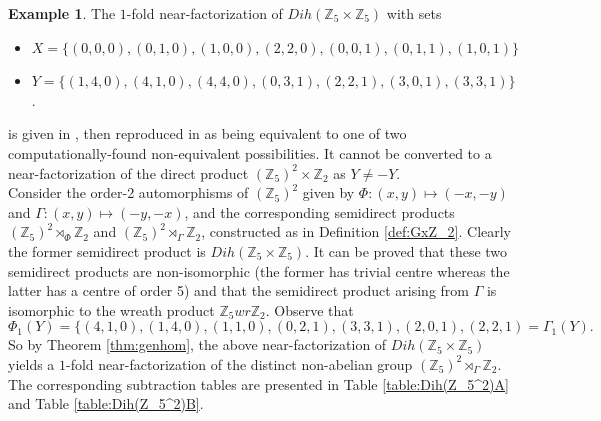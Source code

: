 \documentclass[12pt, a4paper]{article}
\theoremstyle{definition}
\newtheorem{example}[theorem]{Example}
\begin{document}
\begin{example}\label{ex:order50}
The $1$-fold near-factorization of $Dih(\mathbb{Z}_5 \times \mathbb{Z}_5)$ with sets
\begin{itemize}
\item $X=\{(0,0,0), (0,1,0),(1,0,0),(2,2,0),(0,0,1),(0,1,1),(1,0,1)\}$
\item $Y=\{(1,4,0),(4,1,0),(4,4,0),(0,3,1),(2,2,1),(3,0,1),(3,3,1)\}$.  
\end{itemize}
is given in \cite{Pec}, then reproduced in \cite{KrePatSti} as being equivalent to one of two computationally-found non-equivalent possibilities.  It cannot be converted to a near-factorization of the direct product $(\mathbb{Z}_5)^2 \times \mathbb{Z}_2$ as $Y \neq -Y$.\\
Consider the order-2 automorphisms of $(\mathbb{Z}_5)^2$ given by $\Phi:(x,y) \mapsto (-x,-y)$ and $\Gamma:(x,y) \mapsto (-y,-x)$, and the corresponding semidirect products $(\mathbb{Z}_5)^2 \rtimes_{\Phi} \mathbb{Z}_2$ and $(\mathbb{Z}_5)^2 \rtimes_{\Gamma} \mathbb{Z}_2$, constructed as in Definition \ref{def:GxZ_2}. Clearly the former semidirect product is $Dih(\mathbb{Z}_5 \times \mathbb{Z}_5)$. It can be proved that these two semidirect products are non-isomorphic (the former has trivial centre whereas the latter has a centre of order 5) and that the semidirect product arising from $\Gamma$ is isomorphic to the wreath product $\mathbb{Z}_5 wr \mathbb{Z}_2$.
Observe that 
$$ \Phi_1(Y)=\{(4,1,0),(1,4,0),(1,1,0),(0,2,1),(3,3,1),(2,0,1),(2,2,1)=\Gamma_1(Y).$$
So by Theorem \ref{thm:genhom}, the above near-factorization of $Dih(\mathbb{Z}_5 \times \mathbb{Z}_5)$ yields a $1$-fold near-factorization of the distinct non-abelian group $(\mathbb{Z}_5)^2 \rtimes_{\Gamma} \mathbb{Z}_2$. The corresponding subtraction tables are presented in Table \ref{table:Dih(Z_5^2)A} and Table \ref{table:Dih(Z_5^2)B}.
\end{example}
\end{document}
